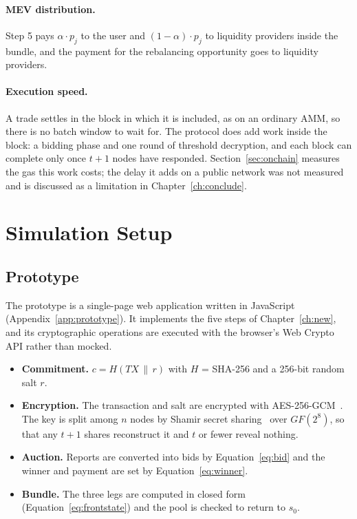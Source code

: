\paragraph{MEV distribution.} Step 5 pays $\alpha\cdot p_j$ to the user and $(1-\alpha)\cdot p_j$ to liquidity providers inside the bundle, and the payment for the rebalancing opportunity goes to liquidity providers.

\paragraph{Execution speed.} A trade settles in the block in which it is included, as on an ordinary AMM, so there is no batch window to wait for. The protocol does add work inside the block: a bidding phase and one round of threshold decryption, and each block can complete only once $t+1$ nodes have responded. Section~\ref{sec:onchain} measures the gas this work costs; the delay it adds on a public network was not measured and is discussed as a limitation in Chapter~\ref{ch:conclude}.

\section{Simulation Setup}
\label{sec:sim-setup}

\subsection{Prototype}

The prototype is a single-page web application written in JavaScript (Appendix~\ref{app:prototype}). It implements the five steps of Chapter~\ref{ch:new}, and its cryptographic operations are executed with the browser's Web Crypto API rather than mocked.

\begin{itemize}
    \item \textbf{Commitment.} $c=H(TX\,\|\,r)$ with $H$ = SHA-256 and a 256-bit random salt $r$.
    \item \textbf{Encryption.} The transaction and salt are encrypted with AES-256-GCM~\cite{dworkin2007gcm}. The key is split among $n$ nodes by Shamir secret sharing~\cite{shamir1979share} over $GF(2^8)$, so that any $t+1$ shares reconstruct it and $t$ or fewer reveal nothing.
    \item \textbf{Auction.} Reports are converted into bids by Equation~\ref{eq:bid} and the winner and payment are set by Equation~\ref{eq:winner}.
    \item \textbf{Bundle.} The three legs are computed in closed form (Equation~\ref{eq:frontstate}) and the pool is checked to return to $s_0$.
\end{itemize}


